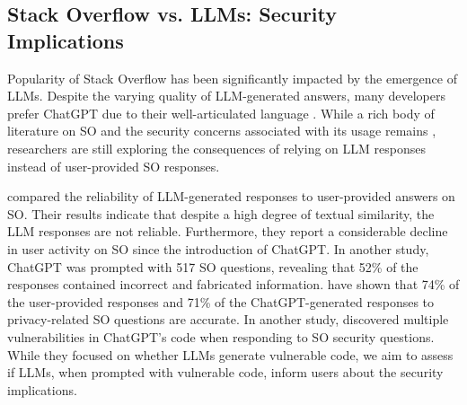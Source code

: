 \subsection{Stack Overflow vs. LLMs: Security Implications} 
\label{concerns_in_llms_vs_SO}
Popularity of Stack Overflow has been significantly impacted by the emergence of LLMs\citep{da2024chatgpt}. Despite the varying quality of LLM-generated answers, many developers prefer ChatGPT due to their well-articulated language \citep{kabir2024stack}. While a rich body of literature on SO and the security concerns associated with its usage remains \citep{yang2016security, licorish2021contextual, fischer2017stack, zhang2018code}, researchers are still exploring the consequences of relying on LLM responses instead of user-provided SO responses. 

\cite{da2024chatgpt} compared the reliability of LLM-generated responses to user-provided answers on SO. Their results indicate that despite a high degree of textual similarity, the LLM responses are not reliable. Furthermore, they report a considerable decline in user activity on SO since the introduction of ChatGPT. %
In another study, ChatGPT was prompted with 517 SO questions, revealing that 52\% of the responses contained incorrect and fabricated information\citep{kabir2024stack}. %
\cite{delile2023evaluating} have shown that 74\% of the user-provided responses and 71\% of the ChatGPT-generated responses to privacy-related SO questions are accurate. In another study, \cite{hamer2024just} discovered multiple vulnerabilities in ChatGPT's code when responding to SO security questions. While they focused on whether LLMs generate vulnerable code, we aim to assess if LLMs, when prompted with vulnerable code, inform users about the security implications.

